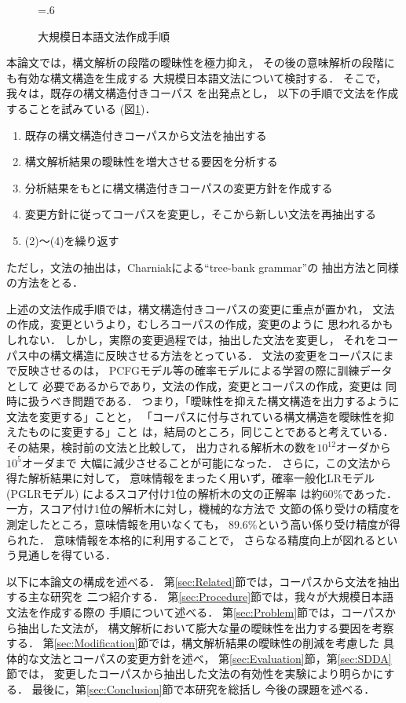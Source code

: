 \begin{figure}[tp]
  \centering
  \epsfxsize=.6\textwidth
  \caption{大規模日本語文法作成手順}
  \label{fig:procedure}
\end{figure}
\fi

本論文では，構文解析の段階の曖昧性を極力抑え，
その後の意味解析の段階にも有効な構文構造を生成する
大規模日本語文法について検討する．
そこで，我々は，既存の構文構造付きコーパス
を出発点とし，
以下の手順で文法を作成することを試みている
(図\ref{fig:procedure})．
\begin{enumerate}
\item 既存の構文構造付きコーパスから文法を抽出する
\item 構文解析結果の曖昧性を増大させる要因を分析する
\item 分析結果をもとに構文構造付きコーパスの変更方針を作成する
\item 変更方針に従ってコーパスを変更し，そこから新しい文法を再抽出する
\item (2)〜(4)を繰り返す
\end{enumerate}
ただし，文法の抽出は，Charniakによる``tree-bank grammar''の
抽出方法\cite{charniak:96}と同様の方法をとる．

上述の文法作成手順では，構文構造付きコーパスの変更に重点が置かれ，
文法の作成，変更というより，むしろコーパスの作成，変更のように
思われるかもしれない．
しかし，実際の変更過程では，抽出した文法を変更し，
それをコーパス中の構文構造に反映させる方法をとっている．
文法の変更をコーパスにまで反映させるのは，
PCFGモデル等の確率モデルによる学習の際に訓練データとして
必要であるからであり，文法の作成，変更とコーパスの作成，変更は
同時に扱うべき問題である．
つまり，「曖昧性を抑えた構文構造を出力するように文法を変更する」ことと，
「コーパスに付与されている構文構造を曖昧性を抑えたものに変更する」こと
は，結局のところ，同じことであると考えている．
\fi
その結果，検討前の文法と比較して，
出力される解析木の数を$10^{12}$オーダから$10^5$オーダまで
大幅に減少させることが可能になった．
さらに，この文法から得た解析結果に対して，
意味情報をまったく用いず，確率一般化LRモデル(PGLRモデル)
\cite{inui:98}によるスコア付け1位の解析木の文の正解率
は約60\%であった．
一方，スコア付け1位の解析木に対し，機械的な方法で
文節の係り受けの精度を測定したところ，意味情報を用いなくても，
89.6\%という高い係り受け精度が得られた．
意味情報を本格的に利用することで，
さらなる精度向上が図れるという見通しを得ている．

以下に本論文の構成を述べる．
第\ref{sec:Related}節では，コーパスから文法を抽出する主な研究を
二つ紹介する．
第\ref{sec:Procedure}節では，我々が大規模日本語文法を作成する際の
手順について述べる．
第\ref{sec:Problem}節では，コーパスから抽出した文法が，
構文解析において膨大な量の曖昧性を出力する要因を考察する．
第\ref{sec:Modification}節では，構文解析結果の曖昧性の削減を考慮した
具体的な文法とコーパスの変更方針を述べ，
第\ref{sec:Evaluation}節，第\ref{sec:SDDA}節では，
変更したコーパスから抽出した文法の有効性を実験により明らかにする．
最後に，第\ref{sec:Conclusion}節で本研究を総括し
今後の課題を述べる．

